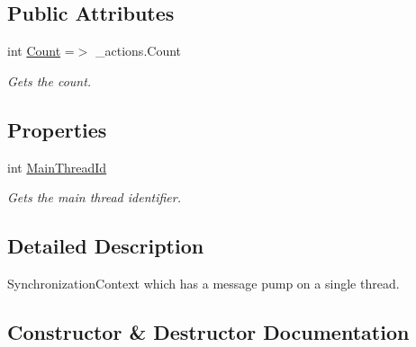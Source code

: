\subsection*{Public Attributes}
\begin{DoxyCompactItemize}
\item 
int \hyperlink{class_minimu_async_bridge_unit_test_1_1_single_thread_synchronization_context_a035899c93f3788e59c565f633b8b6a8e}{Count} =$>$ \+\_\+actions.\+Count
\begin{DoxyCompactList}\small\item\em Gets the count. \end{DoxyCompactList}\end{DoxyCompactItemize}
\subsection*{Properties}
\begin{DoxyCompactItemize}
\item 
int \hyperlink{class_minimu_async_bridge_unit_test_1_1_single_thread_synchronization_context_aaa40e78add3ae26af39fdcc129f20344}{Main\+Thread\+Id}
\begin{DoxyCompactList}\small\item\em Gets the main thread identifier. \end{DoxyCompactList}\end{DoxyCompactItemize}


\subsection{Detailed Description}
Synchronization\+Context which has a message pump on a single thread. 



\subsection{Constructor \& Destructor Documentation}
\mbox{\label{class_minimu_async_bridge_unit_test_1_1_single_thread_synchronization_context_aa3232bec413b52ace0ab6a088e554cd0}} 
